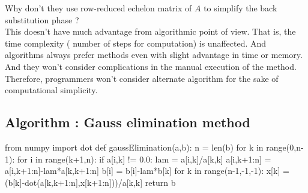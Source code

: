 \begin{remark}
\begin{commentary}
		Why don't they use row-reduced echelon matrix of $A$ to simplify the back substitution phase ?\\

		This doesn't have much advantage from algorithmic point of view. That is, the time complexity ( number of steps for computation) is unaffected. And algorithms always prefer methods even with slight advantage in time or memory. And they won't consider complications in the manual execution of the method. Therefore, programmers won't consider alternate algorithm for the sake of computational simplicity.
\end{commentary}
\end{remark}

\subsection{Algorithm : Gauss elimination method}
\begin{program}
	\begin{python}
	from numpy import dot
	def gaussElimination(a,b):
		n = len(b)
		for k in range(0,n-1):
			for i in range(k+1,n):
				if a[i,k] != 0.0:
					lam = a[i,k]/a[k,k]
					a[i,k+1:n] = a[i,k+1:n]-lam*a[k,k+1:n]
					b[i] = b[i]-lam*b[k]
		for k in range(n-1,-1,-1):
			x[k] = (b[k]-dot(a[k,k+1:n],x[k+1:n]))/a[k,k]
		return b
	\end{python}
\end{program}

